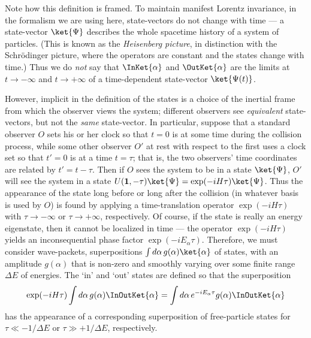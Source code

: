 Note how this definition is framed. To maintain manifest Lorentz invariance,
in the formalism we are using here, state-vectors do not change with time ---
a state-vector $\ket{\Psi}$ describes the whole spacetime history of a system
of particles. (This is known as the \textit{Heisenberg picture}, in
distinction with the Schr\"odinger picture, where the operators are constant
and the states change with time.) Thus we do \textit{not} say that
$\InKet{\alpha}$ and $\OutKet{\alpha}$ are the
limits at $t\to-\infty$ and $t\to+\infty$ of a time-dependent state-vector
$\ket{\Psi(t)}$.

However, implicit in the definition of the states is a choice of the inertial
frame from which the observer views the system; different observers see
\textit{equivalent} state-vectors, but not the \textit{same} state-vector. In
particular, suppose that a standard observer $O$ sets his or her clock so that
$t=0$ is at some time during the collision process, while some other observer
$O'$ at rest with respect to the first uses a clock set so that $t'=0$ is at a
time $t=\tau$; that is, the two observers' time coordinates are related by
$t'=t-\tau$. Then if $O$ sees the system to be in a state $\ket{\Psi}$, $O'$
will see the system in a state
$U(\mathbf{1},-\tau)\ket{\Psi}=\exp(-iH\tau)\ket{\Psi}$. Thus the appearance
of the state long before or long after the collision (in whatever basis is
used by $O$) is found by applying a time-translation operator
$\exp(-iH\tau)$ with $\tau\to-\infty$ or $\tau\to+\infty$, respectively. Of
course, if the state is really an energy eigenstate, then it cannot be
localized in time --- the operator $\exp(-iH\tau)$ yields an inconsequential
phase factor $\exp(-iE_\alpha\tau)$. Therefore, we must consider
wave-packets, superpositions $\int d\alpha\,g(\alpha)\ket{\alpha}$ of states,
with an amplitude $g(\alpha)$ that is non-zero and smoothly varying over some
finite range $\Delta E$ of energies. The `in' and `out' states are defined so
that the superposition
\[
\exp(-iH\tau)\int d\alpha\,g(\alpha)
\InOutKet{\alpha}
=\int d\alpha\,e^{-iE_\alpha\tau}g(\alpha)
\InOutKet{\alpha}
\]
has the appearance of a corresponding superposition of free-particle states
for $\tau\ll-1/\Delta E$ or $\tau\gg+1/\Delta E$, respectively.

